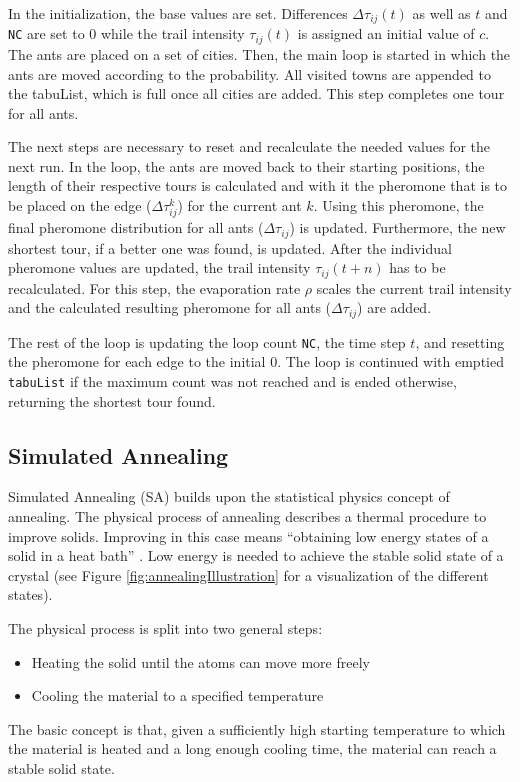 In the initialization, the base values are set.
Differences $\Delta\tau_{ij}(t)$ as well as $t$ and \texttt{NC} are set to $0$ while the trail intensity $\tau_{ij}(t)$ is assigned an initial value of $c$.
The ants are placed on a set of cities.
Then, the main loop is started in which the ants are moved according to the probability.
All visited towns are appended to the tabuList, which is full once all cities are added.
This step completes one tour for all ants.

The next steps are necessary to reset and recalculate the needed values for the next run.
In the loop, the ants are moved back to their starting positions, the length of their respective tours is calculated and with it the pheromone that is to be placed on the edge ($\Delta\tau_{ij}^k$) for the current ant $k$.
Using this pheromone, the final pheromone distribution for all ants ($\Delta\tau_{ij}$) is updated.
Furthermore, the new shortest tour, if a better one was found, is updated.
After the individual pheromone values are updated, the trail intensity $\tau_{ij}(t+n)$ has to be recalculated. 
For this step, the evaporation rate $\rho$ scales the current trail intensity and the calculated resulting pheromone for all ants ($\Delta\tau_{ij}$) are added.

The rest of the loop is updating the loop count \texttt{NC}, the time step $t$, and resetting the pheromone for each edge to the initial $0$.
The loop is continued with emptied \texttt{tabuList} if the maximum count was not reached and is ended otherwise, returning the shortest tour found.






\subsection{Simulated Annealing}
\label{subsec:simulatedAnnealingBackground}

Simulated Annealing (SA) builds upon the statistical physics concept of annealing.
The physical process of annealing describes a thermal procedure to improve solids.
Improving in this case means \enquote{obtaining low energy states of a solid in a heat bath} \cite{aarts_simulated_2005}.
Low energy is needed to achieve the stable solid state of a crystal \cite{delahaye_simulated_2019} (see Figure \ref{fig:annealingIllustration} for a visualization of the different states).

The physical process is split into two general steps:
\begin{itemize}
	\item Heating the solid until the atoms can move more freely
	\item Cooling the material to a specified temperature
\end{itemize}
The basic concept is that, given a sufficiently high starting temperature to which the material is heated and a long enough cooling time, the material can reach a stable solid state. 

